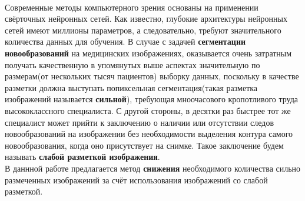 \\
\indent Современные методы компьютерного зрения основаны на применении свёрточных нейронных сетей. Как известно, глубокие архитектуры нейронных сетей имеют миллионы параметров, а следовательно, требуют значительного количества данных для обучения. В случае с задачей {\bf сегментации  новообразований} на медицинских изображениях, оказывается очень затратным получать качественную в упомянутых выше аспектах значительную по размерам(от нескольких тысяч пациентов) выборку данных, поскольку в качестве разметки должна выступать попиксельная сегментация(такая разметка изображений называется {\bf сильной}), требующая мноочасового кропотливого труда высококлассного специалиста. С другой стороны, в десятки раз быстрее тот же специалист может прийти к заключению о наличии или отсутствии следов новообразований на изображении без необходимости выделения контура самого новообразования, когда оно присутствует на снимке. Такое заключение будем называть {\bf слабой разметкой изображения}. 
\\
\indent В даннной работе предлагается метод {\bf снижения} необходимого количества сильно размеченных изображений за счёт использования изображений со слабой разметкой.
